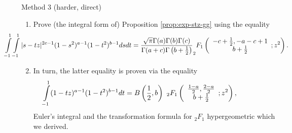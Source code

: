 \documentclass[pdf,notes]{beamer}
\begin{document}
\begin{frame}{Method 3 (harder, direct)}
	\begin{enumerate}
		\item Prove (the integral form of) Proposition \ref{prop:exp-stz-gg}
			using the equality {\scriptsize \begin{equation}
				\kern-1.5cm \int_{- 1}^1 \int_{- 1}^1 | s - t z |^{2 c - 1} (1 - s^2)^{a - 1} (1 -
				t^2)^{b - 1} d s d t = \frac{\sqrt{\pi} \Gamma (a) \Gamma (b) \Gamma
			(c)}{\Gamma (a + c) \Gamma \left( b + \frac{1}{2} \right)} _2 F_1 \left(
			\begin{array}{c}
				  - c + \frac{1}{2}, - a - c + 1\\
				    b + \frac{1}{2}
			    \end{array} ; z^2 \right) .
				\label{eqn:prop21}
			\end{equation}}
		\item In turn, the latter equality is proven via the equality {\scriptsize \begin{equation}
				\kern-1.5cm \int_{-1}^1(1-t z)^{a-1}(1-t^2)^{b-1}d t=B\left(\frac{1}{2},b  \right)\ {}_2F_1\left( 
				\begin{array}[]{c}
					\frac{1-a}{2},\frac{2-a}{2}\\b+\frac{1}{2}
				\end{array}
				;z^2 \right),
				\label{eqn:lem31}
			\end{equation}}
			Euler's integral and the transformation formula for $_2F_1$ hypergeometric which we derived.
	\end{enumerate}
\end{frame}
\end{document}
